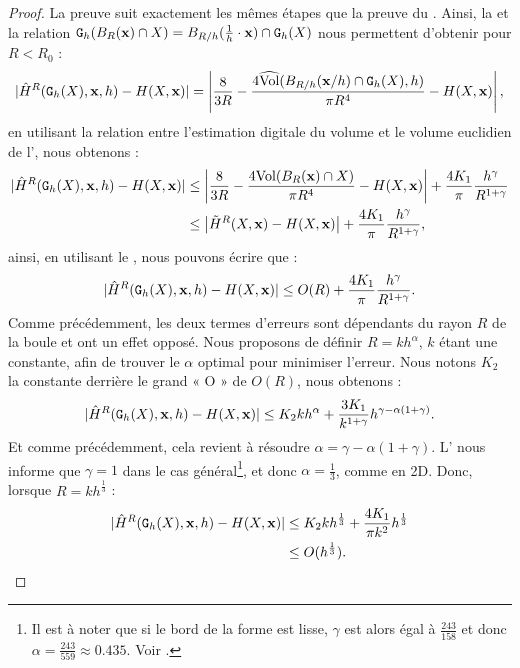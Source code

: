 \begin{proof}
  La preuve suit exactement les mêmes étapes que la preuve du
  . Ainsi, la
   et la relation
  $\DigF{\Ball{R}{\vx} \cap \Shape}{h}=\Ball{R/h}{\frac{1}{h} \cdot \vx} \cap \DSh$ nous
  permettent d'obtenir pour $R < R_0$ :
  \begin{equation}
    | \MeanCurvH{R}(\DSh,\vx,h) - \MeanCurv(\Shape,\vx) |
    = \left|\frac{8}{3R}-\frac{4\VolC(\Ball{R/h}{\vx / h} \cap \DSh, h)}{\pi R^4} - \MeanCurv(\Shape,\vx) \right|,
  \end{equation}
  en utilisant la relation entre l'estimation digitale du volume et le volume
  euclidien de l', nous obtenons :
  \begin{align}\label{eq-meancurvhat-error-bound-prelim}
    | \MeanCurvH{R}(\DSh,\vx,h) - \MeanCurv(\Shape,\vx) |
    &\le \left|\frac{8}{3R}-\frac{4\Vol(\Ball{R}{\vx} \cap \Shape)}{\pi R^4} - \MeanCurv(\Shape,\vx) \right| + \frac{4 K_1}{\pi} \frac{h^\gamma}{R^{1+\gamma}} \nonumber \\
    &\le \left|\MeanCurvT{R}(\Shape,\vx) - \MeanCurv(\Shape,\vx) \right| + \frac{4 K_1}{\pi} \frac{h^\gamma}{R^{1+\gamma}},
  \end{align}
  ainsi, en utilisant le , nous pouvons
  écrire que :
  \begin{equation}\label{eq-meancurvhat-error-bound-prelim2}
    | \MeanCurvH{R}(\DSh,\vx,h) - \MeanCurv(\Shape,\vx) |
    \le O(R) + \frac{4 K_1}{\pi} \frac{h^\gamma}{R^{1+\gamma}}.
  \end{equation}
  Comme précédemment, les deux termes d'erreurs sont dépendants du rayon $R$ de
  la boule et ont un effet opposé. Nous proposons de définir $R = k h^{\alpha}$,
  $k$ étant une constante, afin de trouver le $\alpha$ optimal pour minimiser
  l'erreur. Nous notons $K_2$ la constante derrière le grand « O » de $O(R)$,
  nous obtenons :
  \begin{equation}\label{eq-meancurvhat-error-bound-prelim3}
    | \MeanCurvH{R}(\DSh,\vx,h) - \MeanCurv(\Shape,\vx) |
    \le K_2kh^\alpha + \frac{3K_1}{k^{1+\gamma}}h^{\gamma - \alpha(1+\gamma)}.
  \end{equation}
  Et comme précédemment, cela revient à résoudre $\alpha = \gamma -
  \alpha(1+\gamma)$. L' nous informe que
  $\gamma = 1$ dans le cas général\footnote{Il est à noter que si le bord de la
  forme est lisse, $\gamma$ est alors égal à $\frac{243}{158}$ et donc $\alpha =
  \frac{243}{559} \approx 0.435$. Voir .}, et
  donc $\alpha = \frac{1}{3}$, comme en 2D. Donc, lorsque $R=kh^{\frac{1}{3}}$ :
  \begin{align}\label{eq-meancurvhat-error-bound-prelim4}
    | \MeanCurvH{R}(\DSh,\vx,h) - \MeanCurv(\Shape,\vx) |
    &\le K_2kh^\frac{1}{3} + \frac{4K_1}{\pi k^2}h^{\frac{1}{3}}\\
    &\le O(h^\frac{1}{3}).
  \end{align}
\end{proof}
